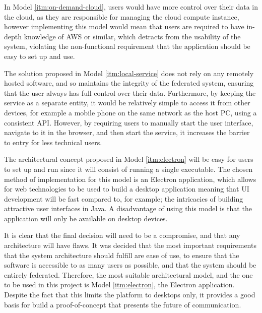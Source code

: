In Model \ref{itm:on-demand-cloud}, users would have more control over their data in the cloud, as they are responsible for managing the cloud compute instance, however implementing this model would mean that users are required to have in-depth knowledge of AWS or similar, which detracts from the usability of the system, violating the non-functional requirement that the application should be easy to set up and use.

The solution proposed in Model \ref{itm:local-service} does not rely on any remotely hosted software, and so maintains the integrity of the federated system, ensuring that the user always has full control over their data. Furthermore, by keeping the service as a separate entity, it would be relatively simple to access it from other devices, for example a mobile phone on the same network as the host PC, using a consistent API. However, by requiring users to manually start the user interface, navigate to it in the browser, and then start the service, it increases the barrier to entry for less technical users.

The architectural concept proposed in Model \ref{itm:electron} will be easy for users to set up and run since it will consist of running a single executable. The chosen method of implementation for this model is an Electron application, which allows for web technologies to be used to build a desktop application \cite{electron} meaning that UI development will be fast compared to, for example; the intricacies of building attractive user interfaces in Java. A disadvantage of using this model is that the application will only be available on desktop devices.

It is clear that the final decision will need to be a compromise, and that any architecture will have flaws. It was decided that the most important requirements that the system architecture should fulfill are ease of use, to ensure that the software is accessible to as many users as possible, and that the system should be entirely federated. Therefore, the most suitable architectural model, and the one to be used in this project is Model \ref{itm:electron}, the Electron application. Despite the fact that this limits the platform to desktops only, it provides a good basis for build a proof-of-concept that presents the future of communication.

